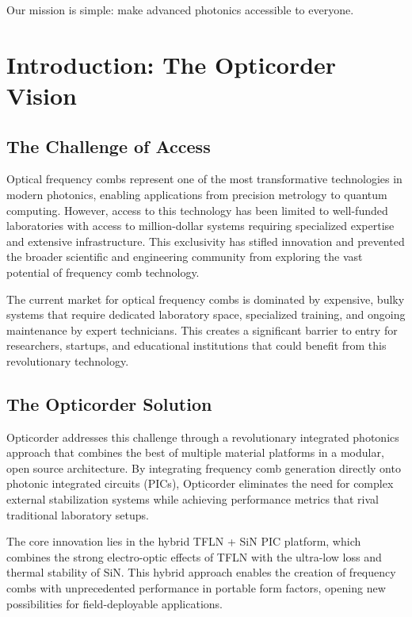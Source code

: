 \documentclass[11pt,a4paper]{article}
\begin{document}
Our mission is simple: make advanced photonics accessible to everyone.

\newpage
\tableofcontents
\newpage

\section{Introduction: The Opticorder Vision}

\subsection{The Challenge of Access}
Optical frequency combs represent one of the most transformative technologies in modern photonics, enabling applications from precision metrology to quantum computing. However, access to this technology has been limited to well-funded laboratories with access to million-dollar systems requiring specialized expertise and extensive infrastructure. This exclusivity has stifled innovation and prevented the broader scientific and engineering community from exploring the vast potential of frequency comb technology.

The current market for optical frequency combs is dominated by expensive, bulky systems that require dedicated laboratory space, specialized training, and ongoing maintenance by expert technicians. This creates a significant barrier to entry for researchers, startups, and educational institutions that could benefit from this revolutionary technology.

\subsection{The Opticorder Solution}
Opticorder addresses this challenge through a revolutionary integrated photonics approach that combines the best of multiple material platforms in a modular, open source architecture. By integrating frequency comb generation directly onto photonic integrated circuits (PICs), Opticorder eliminates the need for complex external stabilization systems while achieving performance metrics that rival traditional laboratory setups.

The core innovation lies in the hybrid TFLN + SiN PIC platform, which combines the strong electro-optic effects of TFLN with the ultra-low loss and thermal stability of SiN. This hybrid approach enables the creation of frequency combs with unprecedented performance in portable form factors, opening new possibilities for field-deployable applications.
\end{document}
